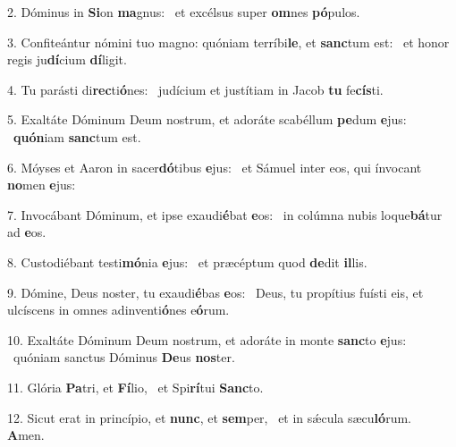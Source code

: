 2. Dóminus in \textbf{Si}on \textbf{ma}gnus: \ast\  et excélsus super \textbf{om}nes \textbf{pó}pulos.\

3. Confiteántur nómini tuo magno: quóniam terríbi\textbf{le}, et \textbf{sanc}tum est: \ast\  et honor regis ju\textbf{dí}cium \textbf{dí}ligit.\

4. Tu parásti di\textbf{rec}ti\textbf{ó}nes: \ast\  judícium et justítiam in Jacob \textbf{tu} fe\textbf{cís}ti.\

5. Exaltáte Dóminum Deum nostrum, et adoráte scabéllum \textbf{pe}dum \textbf{e}jus: \ast\  \textbf{quón}iam \textbf{sanc}tum est.\

6. Móyses et Aaron in sacer\textbf{dó}tibus \textbf{e}jus: \ast\  et Sámuel inter eos, qui ínvocant \textbf{no}men \textbf{e}jus:\

7. Invocábant Dóminum, et ipse exaudi\textbf{é}bat \textbf{e}os: \ast\  in colúmna nubis loque\textbf{bá}tur ad \textbf{e}os.\

8. Custodiébant testi\textbf{mó}nia \textbf{e}jus: \ast\  et præcéptum quod \textbf{de}dit \textbf{il}lis.\

9. Dómine, Deus noster, tu exaudi\textbf{é}bas \textbf{e}os: \ast\  Deus, tu propítius fuísti eis, et ulcíscens in omnes adinventi\textbf{ó}nes e\textbf{ó}rum.\

10. Exaltáte Dóminum Deum nostrum, et adoráte in monte \textbf{sanc}to \textbf{e}jus: \ast\  quóniam sanctus Dóminus \textbf{De}us \textbf{nos}ter.\

11. Glória \textbf{Pa}tri, et \textbf{Fí}lio, \ast\  et Spi\textbf{rí}tui \textbf{Sanc}to.\

12. Sicut erat in princípio, et \textbf{nunc}, et \textbf{sem}per, \ast\  et in sǽcula sæcu\textbf{ló}rum. \textbf{A}men.\

